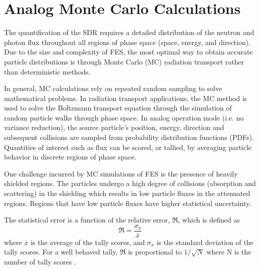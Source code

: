 


\section{Analog Monte Carlo Calculations} \label{sec:analog_mc}

The quantification of the SDR requires a detailed distribution of the
neutron and photon flux throughout all regions of phase space (space, energy,
and direction).  Due to the size and complexity of FES, the most optimal way to 
obtain accurate particle distributions is through Monte Carlo (MC) radiation transport 
rather than deterministic methods.


In general, MC calculations rely on repeated random sampling to solve
mathematical problems.  In radiation transport applications, the MC method is 
used to solve the Boltzmann transport equation \cite{l_m} through the simulation of random particle
walks through phase space.  In analog operation mode (i.e. no variance reduction), 
the source particle's position, energy, direction
and subsequent collisions are sampled from probability
distribution functions (PDFs).  Quantities of interest such as flux can be
scored, or tallied, by averaging particle behavior
in discrete regions of phase space.

One challenge incurred by MC simulations of FES is the presence of heavily
shielded regions.  The particles undergo a high degree of
collisions (absorption and scattering) in the shielding which results in low
particle fluxes in the attenuated regions.  Regions that have low
particle fluxes have higher statistical uncertainty.

The statistical error is a function of the relative error, $\Re$, which is defined as
\begin{equation} \label{eq:1.2}
		\Re = \frac{\sigma_{\overline{x}}}{{\overline{x}}}
\end{equation}
where $\overline{x}$ is the average of the tally scores, and $\sigma_{\overline{x}}$ is the standard
deviation of the tally scores.  For a well behaved tally, $\Re$ is proportional
to $1/\sqrt{N}$ where N is the number of tally scores \cite{mcnp_manual}.


